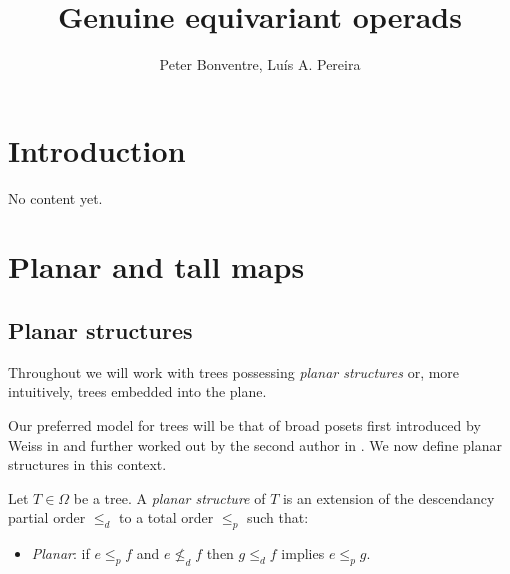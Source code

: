 \documentclass[a4paper,10pt]{article}%
\author{Peter Bonventre, Lu\'is A. Pereira}%
\title{Genuine equivariant operads}%
\begin{document}
	\maketitle%



\tableofcontents

\section{Introduction}

No content yet.




\section{Planar and tall maps}

\subsection{Planar structures}


Throughout we will work with trees possessing \textit{planar structures} or, more intuitively, trees embedded into the plane.

Our preferred model for trees will be that of broad posets first introduced by Weiss in \cite{We12} and further worked out by the second author in \cite{Pe16b}. We now define planar structures in this context.


\begin{definition}\label{PLANARIZE DEF}
	Let $T \in \Omega$ be a tree. A \textit{planar structure} of $T$ is an extension of the descendancy partial order $\leq_d$ to a total order $\leq_p$ such that: 
	\begin{itemize}
		\item \textit{Planar}: if $e \leq_p f$ and $e \nleq_d f$ then 
		$g \leq_d f$ implies $e \leq_p g$.
	\end{itemize} 
\end{definition}
\end{document}
